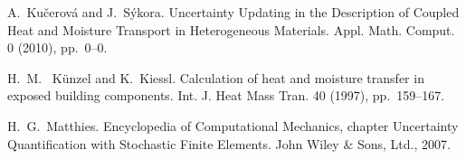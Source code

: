 
\begin{thebibliography}{10}
{\sc A.~Ku\v{c}erov\'a and J.~S\'ykora}. {Uncertainty Updating in the Description of Coupled Heat and Moisture Transport in Heterogeneous Materials}. Appl. Math. Comput. 0 (2010), pp.~0--0.

{\sc H.~M.~ K\"{u}nzel and K.~Kiessl}. {Calculation of heat and moisture transfer in exposed building components}. Int. J. Heat Mass Tran. 40 (1997), pp.~159--167.

{\sc H.~G.~Matthies}. {Encyclopedia of Computational Mechanics}, chapter Uncertainty Quantification with Stochastic Finite Elements. John Wiley \& Sons, Ltd., 2007.
\end{thebibliography}
